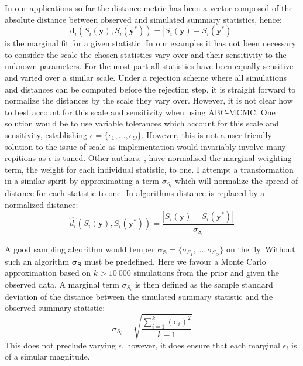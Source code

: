 In our applications so far the distance metric has been a vector composed of the absolute distance between observed and simulated summary statistics, hence:
\begin{equation}
\text{d}_i(S_i(\bm{y}),S_i(\bm{y^*})) = |S_i(\bm{y})-S_i(\bm{y^*})|
\end{equation}
is the marginal fit for a given statistic. In our examples it has not been necessary to consider the scale the chosen statistics vary over and their sensitivity to the unknown parameters. For the most part all statistics have been equally sensitive and varied over a similar scale. Under a rejection scheme where all simulations and distances can be computed before the rejection step, it is straight forward to normalize the distances by the scale they vary over. However, it is not clear how to best account for this scale and sensitivity when using ABC-MCMC. One solution would be to use variable tolerances which account for this scale and sensitivity, establishing $\epsilon = \{\epsilon_1,\dots,\epsilon_O\}$. However, this is not a user friendly solution to the issue of scale as implementation would invariably involve many repitions as $\epsilon$ is tuned. Other authors, \citet{Ratmann2010}, have normalised the marginal weighting term, the weight for each individual statistic, to one. I attempt a transformation in a similar spirit by approximating a term $\sigma_{S_i}$ which will normalize the spread of distance for each statistic to one. In algorithms distance is replaced by a normalized-distance:
\begin{equation}
\hat{d_i}(S_i(\bm{y}),S_i(\bm{y^*})) =  \frac{|S_i(\bm{y})-S_i(\bm{y^*})|}{\sigma_{S_i}}
\end{equation}

A good sampling algorithm would temper $\bm{\sigma_S} = \{\sigma_{S_1},\dots,\sigma_{S_O}\}$ on the fly. Without such an algorithm $\bm{\sigma_S}$ must be predefined. Here we favour a Monte Carlo approximation based on $k > 10\ 000$ simulations from the prior and given the observed data. A marginal term $\sigma_{S_i}$ is then defined as the sample standard deviation of the distance between the simulated summary statistic and the observed summary statistic:
\begin{equation}
\sigma_{S_i} = \sqrt{\frac{\sum_{i = 1}^{k}(\text{d}_i)^2}{k-1}}
\end{equation}
This does not preclude varying $\epsilon$, however, it does ensure that each marginal $\epsilon_i$ is of a simular magnitude. \\



